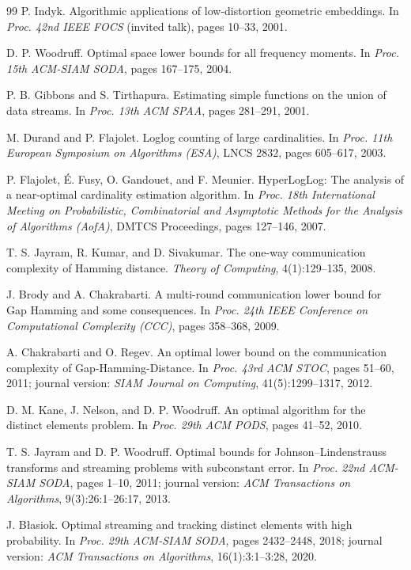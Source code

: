 \documentclass[UTF8, 11pt, a4paper, linestretch=1.15]{ctexart}
\theoremstyle{zhstyle}
\begin{document}
\begin{thebibliography}{99}
		 P. Indyk.
		Algorithmic applications of low-distortion geometric embeddings.
		In \emph{Proc. 42nd IEEE FOCS} (invited talk), pages 10--33, 2001.
		
		 D. P. Woodruff.
		Optimal space lower bounds for all frequency moments.
		In \emph{Proc. 15th ACM-SIAM SODA}, pages 167--175, 2004.
		
		 P. B. Gibbons and S. Tirthapura.
		Estimating simple functions on the union of data streams.
		In \emph{Proc. 13th ACM SPAA}, pages 281--291, 2001.
		
		 M. Durand and P. Flajolet.
		Loglog counting of large cardinalities.
		In \emph{Proc. 11th European Symposium on Algorithms (ESA)}, LNCS 2832,
		pages 605--617, 2003.
		
		 P. Flajolet, \'E. Fusy, O. Gandouet, and F. Meunier.
		HyperLogLog: The analysis of a near-optimal cardinality estimation algorithm.
		In \emph{Proc. 18th International Meeting on Probabilistic, Combinatorial and
			Asymptotic Methods for the Analysis of Algorithms (AofA)}, DMTCS Proceedings,
		pages 127--146, 2007.
		
		 T. S. Jayram, R. Kumar, and D. Sivakumar.
		The one-way communication complexity of Hamming distance.
		\emph{Theory of Computing}, 4(1):129--135, 2008.
		
		 J. Brody and A. Chakrabarti.
		A multi-round communication lower bound for Gap Hamming and some consequences.
		In \emph{Proc. 24th IEEE Conference on Computational Complexity (CCC)},
		pages 358--368, 2009.
		
		 A. Chakrabarti and O. Regev.
		An optimal lower bound on the communication complexity of Gap-Hamming-Distance.
		In \emph{Proc. 43rd ACM STOC}, pages 51--60, 2011;
		journal version: \emph{SIAM Journal on Computing}, 41(5):1299--1317, 2012.
		
		 D. M. Kane, J. Nelson, and D. P. Woodruff.
		An optimal algorithm for the distinct elements problem.
		In \emph{Proc. 29th ACM PODS}, pages 41--52, 2010.
		
		 T. S. Jayram and D. P. Woodruff.
		Optimal bounds for Johnson--Lindenstrauss transforms and streaming problems
		with subconstant error.
		In \emph{Proc. 22nd ACM-SIAM SODA}, pages 1--10, 2011;
		journal version: \emph{ACM Transactions on Algorithms}, 9(3):26:1--26:17, 2013.
		
		 J. B\l asiok.
		Optimal streaming and tracking distinct elements with high probability.
		In \emph{Proc. 29th ACM-SIAM SODA}, pages 2432--2448, 2018;
		journal version: \emph{ACM Transactions on Algorithms}, 16(1):3:1--3:28, 2020.
		

\end{thebibliography}
\end{document}

